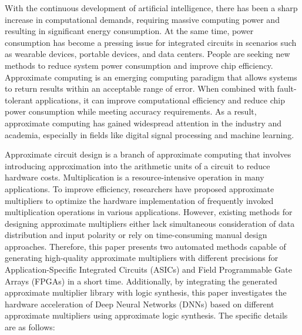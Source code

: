 \begin{abstract*}
      With the continuous development of artificial intelligence, there has been a sharp increase in computational demands, requiring massive computing power and resulting in significant energy consumption. At the same time, power consumption has become a pressing issue for integrated circuits in scenarios such as wearable devices, portable devices, and data centers. People are seeking new methods to reduce system power consumption and improve chip efficiency.
      Approximate computing is an emerging computing paradigm that allows systems to return results within an acceptable range of error. When combined with fault-tolerant applications, it can improve computational efficiency and reduce chip power consumption while meeting accuracy requirements. As a result, approximate computing has gained widespread attention in the industry and academia, especially in fields like digital signal processing and machine learning.
    
      Approximate circuit design is a branch of approximate computing that involves introducing approximation into the arithmetic units of a circuit to reduce hardware costs. Multiplication is a resource-intensive operation in many applications. To improve efficiency, researchers have proposed approximate multipliers to optimize the hardware implementation of frequently invoked multiplication operations in various applications. However, existing methods for designing approximate multipliers either lack simultaneous consideration of data distribution and input polarity or rely on time-consuming manual design approaches. Therefore, this paper presents two automated methods capable of generating high-quality approximate multipliers with different precisions for Application-Specific Integrated Circuits (ASICs) and Field Programmable Gate Arrays (FPGAs) in a short time. Additionally, by integrating the generated approximate multiplier library with logic synthesis, this paper investigates the hardware acceleration of Deep Neural Networks (DNNs) based on different approximate multipliers using approximate logic synthesis. The specific details are as follows:
    

\end{abstract*}
